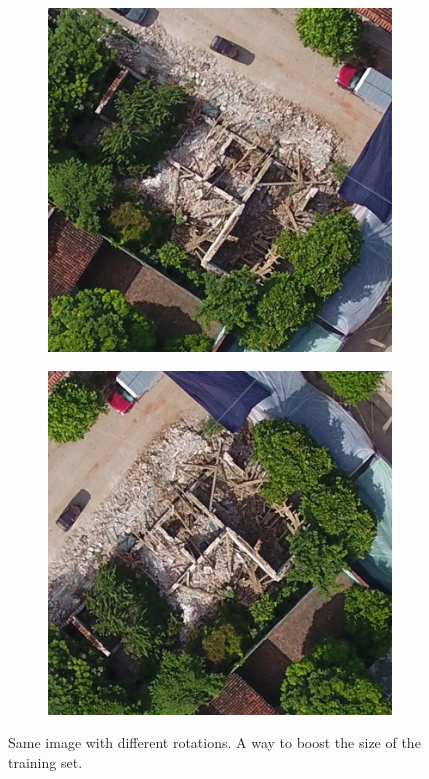 \begin{figure}[!h]
\begin{subfigure}{.24\textwidth}
    \end{subfigure}
    \begin{subfigure}{.24\textwidth}
        \includegraphics[width=\textwidth]{images/rotation1.jpg}
    \end{subfigure}
    \begin{subfigure}{.24\textwidth}
        \includegraphics[width=\textwidth]{images/rotation2.jpg}
    \end{subfigure}
  \caption{Same image with different rotations. A way to boost the size of the training set.}
  \label{fig:rotate}
\end{figure}

